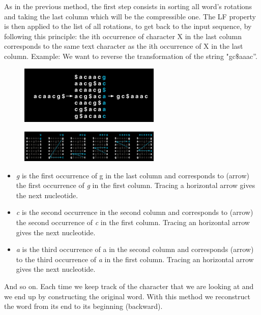 As in the previous method, the first step consists in sorting all word's rotations and taking the last column which will be the compressible one.
The LF property is then applied to the list of all rotations,
to get back to the input sequence, by following this principle: the ith occurrence of character X in the last column corresponds to the same text character as the ith occurrence of X in the last column.
Example: We want to reverse the transformation of the string "gc$\$$aaac”. 

\begin{figure}[h]
\centering
\includegraphics[width=0.6\textwidth]{1LF.png}
\caption{}
\end{figure}

\begin{figure}[h]
\centering
\includegraphics[width=0.6\textwidth]{2LF.png}
\caption{}
\end{figure}

\begin{itemize}
    \item \emph{g} is the first occurrence of g in the last column and corresponds to (arrow) the first occurrence of \emph{g} in the first column. Tracing a horizontal arrow gives the next nucleotide.
    \item \emph{c} is the second occurrence in the second column and corresponds to (arrow) the second occurrence of \emph{c} in the first column. Tracing an horizontal arrow gives the next nucleotide.
    \item \emph{a} is the third occurrence of a in the second column and corresponds (arrow) to the third occurrence of \emph{a} in the first column. Tracing an horizontal arrow gives the next nucleotide.
\end{itemize}

And so on. Each time we keep track of the character that we are looking at and we end up by constructing the original word. With this method we reconstruct the word from its end to its beginning (backward). 

